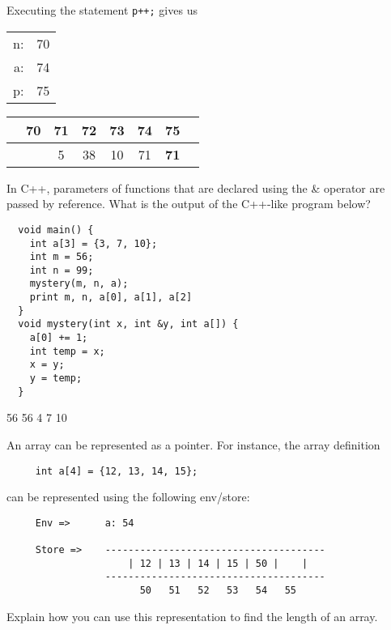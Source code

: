 \documentclass[addpoints]{exam}
\begin{document}
\begin{questions}
\begin{solution}
    Executing the statement \texttt{p++;} gives us

    \begin{tabular}{|r c|}
      \hline
      n: & 70 \\
      a: & 74 \\
      p: & 75 \\
      \hline
    \end{tabular}
    \hspace{1cm}
    \begin{tabular}{c|c|c|c|c|c|c|c}
      \hline
      \multicolumn{1}{c}{} & \multicolumn{1}{c}{70} & \multicolumn{1}{c}{71} & \multicolumn{1}{c}{72} & \multicolumn{1}{c}{73} & \multicolumn{1}{c}{74} & \multicolumn{1}{c}{75} & \\\hline
      &  \bigstrut 38 &  5 & 38 & 10 & 71 & \textbf{71} & \\[1ex]\hline
    \end{tabular}
  \end{solution}

  \newpage
  \question
  In C++, parameters of functions that are declared using the 
  \& operator are passed by reference.
  What is the output of the C++-like program below?
  \begin{verbatim}
  void main() {
    int a[3] = {3, 7, 10};
    int m = 56;
    int n = 99;
    mystery(m, n, a);
    print m, n, a[0], a[1], a[2]
  }
  void mystery(int x, int &y, int a[]) {
    a[0] += 1;
    int temp = x;
    x = y;
    y = temp;
  }
  \end{verbatim}

  \begin{solution}
  56 56 4 7 10
  \end{solution}

  \question
  An array can be represented as a pointer.
  For instance, the array definition
  \begin{verbatim}
     int a[4] = {12, 13, 14, 15}; \end{verbatim}
  can be represented using the following env/store:
{\small
  \begin{verbatim}
     Env =>      a: 54

     Store =>    --------------------------------------
                     | 12 | 13 | 14 | 15 | 50 |    |    
                 --------------------------------------
                       50   51   52   53   54   55  
  \end{verbatim}}   
  Explain how you can use this representation to find the length
  of an array.


\end{questions}
\end{document}
